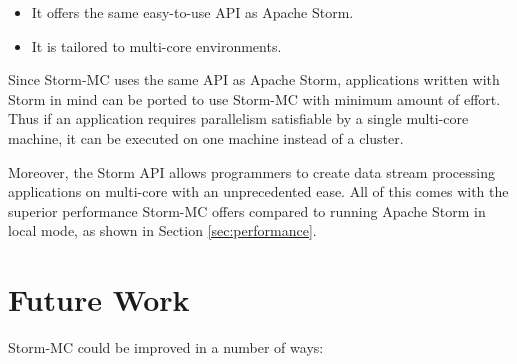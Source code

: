 \documentclass[bsc,logo,frontabs,twoside,singlespacing,normalheadings,parskip]{infthesis}\usepackage[]{graphicx}\usepackage[]{color}
\begin{document}
\begin{itemize}
	\item It offers the same easy-to-use API as Apache Storm.
	\item It is tailored to multi-core environments.
\end{itemize}

Since Storm-MC uses the same API as Apache Storm, applications written with Storm in mind can be ported to use Storm-MC with minimum amount of effort. Thus if an application requires parallelism satisfiable by a single multi-core machine, it can be executed on one machine instead of a cluster.

Moreover, the Storm API allows programmers to create data stream processing applications on multi-core with an unprecedented ease. All of this comes with the superior performance Storm-MC offers compared to running Apache Storm in local mode, as shown in Section \ref{sec:performance}.

\section{Future Work}
\label{sec:future_work}

Storm-MC could be improved in a number of ways:
\end{document}
